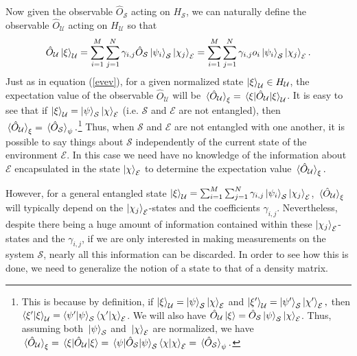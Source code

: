      Now given the observable $\hat{O}_{\mathcal{S}}$ acting on $H_\mathcal{S}$, we can  naturally define the observable $\hat{O}_\mathcal{U}$ acting on $H_\mathcal{U}$ so that 
    \begin{equation}\label{extension}\hat{O}_\mathcal{U}\ket{\xi}_\mathcal{U}=\sum_{i=1}^M\sum_{j=1}^N\gamma_{i,j}\hat{O}_\mathcal{S}\ket{\psi_i}_\mathcal{S}\ket{\chi_j}_\mathcal{E}=\sum_{i=1}^M\sum_{j=1}^N\gamma_{i,j}o_i\ket{\psi_i}_\mathcal{S}\ket{\chi_j}_\mathcal{E}.
    \end{equation}
    Just as in equation (\ref{evev}), for a given normalized state $\ket{\xi}_\mathcal{U}\in H_\mathcal{U}$, the expectation value of the observable $\hat{O}_\mathcal{U}$ will be $\ev*{\hat{O}_\mathcal{U}}_\xi=\ev*{\hat{O}_\mathcal{U}}{\xi}_\mathcal{U}$. It is easy to see that if $\ket{\xi}_\mathcal{U}=\ket{\psi}_\mathcal{S}\ket{\chi}_\mathcal{E}$ (i.e. $\mathcal{S}$ and $\mathcal{E}$ are not entangled), then $\ev*{\hat{O}_\mathcal{U}}_\xi=\ev*{\hat{O}_\mathcal{S}}_\psi.$\footnote{\label{untangledobservable}This is because by definition, if $\ket{\xi}_\mathcal{U}=\ket{\psi}_\mathcal{S}\ket{\chi}_\mathcal{E}$ and $\ket{\xi'}_\mathcal{U}=\ket{\psi'}_\mathcal{S}\ket{\chi'}_\mathcal{E},$ then $\ip{\xi'}{\xi}_\mathcal{U}=\ip{\psi'}{\psi}_\mathcal{S}\ip{\chi'}{\chi}_\mathcal{E}$. We will also have $\hat{O}_\mathcal{U}\ket{\xi}=\hat{O}_\mathcal{S}\ket{\psi}_\mathcal{S}\ket{\chi}_\mathcal{E}$. Thus, assuming both $\ket*{\psi}_\mathcal{S}$ and $\ket*{\chi}_\mathcal{E}$ are normalized, we have $\ev*{\hat{O}_\mathcal{U}}_\xi=\ev*{\hat{O}_\mathcal{U}}{\xi}=\ev*{\hat{O}_\mathcal{S}}{\psi}_\mathcal{S}\ip{\chi}{\chi}_\mathcal{E}=\ev*{\hat{O}_\mathcal{S}}_\psi.$ } Thus, when $\mathcal{S}$ and $\mathcal{E}$ are not entangled with one another, it is possible to say things about $\mathcal{S}$ independently of the current state of the environment  $\mathcal{E}$. In this case we need have no knowledge of the information about $\mathcal{E}$ encapsulated in the state $\ket{\chi}_\mathcal{E}$ to determine the expectation value $\ev*{\hat{O}_\mathcal{U}}_\xi. $
    
    However, for a general entangled state $\ket{\xi}_\mathcal{U}=\sum_{i=1}^M\sum_{j=1}^N\gamma_{i,j}\ket{\psi_i}_\mathcal{S}\ket{\chi_j}_\mathcal{E}$,  $\ev*{\hat{O}_\mathcal{U}}_\xi $ will typically depend on the $\ket{\chi_j}_\mathcal{E}$-states and the coefficients $\gamma_{i,j}$. Nevertheless, despite there being a huge amount of information contained within these $\ket{\chi_j}_\mathcal{E}$-states and the  $\gamma_{i,j}$, if we are only interested in making measurements on the system $\mathcal{S}$, nearly all this information can be discarded. In order to see how this is done, we need to generalize the notion of a state to that of a density matrix. 
